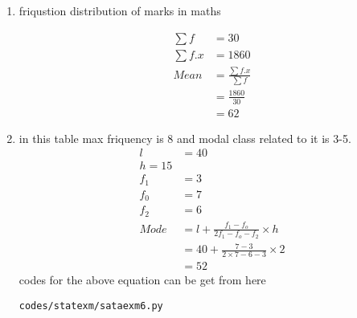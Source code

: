 \renewcommand{\theequation}{\theenumi}
\begin{enumerate}[label=\arabic*.,ref=\thesubsection.\theenumi]
\item \begin{table}[!ht]
	\centering
	
	\caption{friqustion distribution of marks in maths}
\end{table}
\begin{align}
\sum{f} &= 30
\\
\sum{f.x} &= 1860
\\
Mean &= \frac{\sum{f.x}}{\sum{f}}
\\ &= \frac{1860}{30}
\\&= 62
\end{align}
\item in this table max friquency is 8 and modal class related to it is 3-5.
\\
\begin{align}
l &= 40
\\
h = 15
\\
f_1 &= 3
\\
f_0 &= 7
\\
f_2 &= 6
\\
Mode &= l+\frac{f_1 - f_o}{2f_1 - f_o - f_2}\times h
\\
&= 40 +\frac{7 - 3}{2\times 7 - 6- 3}\times 2
\\
&=52
\end{align}
codes for the above equation can be get from here
\begin{lstlisting}
codes/statexm/sataexm6.py
\end{lstlisting}
\end{enumerate}